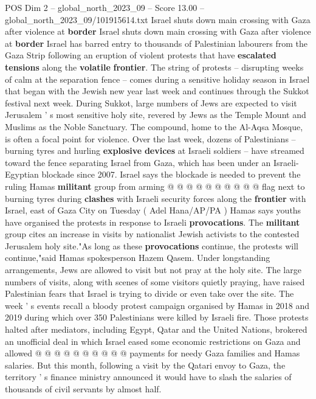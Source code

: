 \begin{textsample}{POS Dim 2 – global\_north\_2023\_09 – Score 13.00 – global\_north\_2023\_09/101915614.txt}  \label{ex:f2_pos_135}
Israel shuts down main crossing with Gaza after violence at \textbf{border} Israel shuts down main crossing with Gaza after violence at \textbf{border} Israel has barred entry to thousands of Palestinian labourers from the Gaza Strip following an eruption of violent protests that have \textbf{escalated} \textbf{tensions} along the \textbf{volatile} \textbf{frontier}.
The string of protests -- disrupting weeks of calm at the separation fence -- comes during a sensitive holiday season in Israel that began with the Jewish new year last week and continues through the Sukkot festival next week.
During Sukkot, large numbers of Jews are expected to visit Jerusalem ' s most sensitive holy site, revered by Jews as the Temple Mount and Muslims as the Noble Sanctuary.
The compound, home to the Al-Aqsa Mosque, is often a focal point for violence.
Over the last week, dozens of Palestinians -- burning tyres and hurling \textbf{explosive} \textbf{devices} at Israeli soldiers -- have streamed toward the fence separating Israel from Gaza, which has been under an Israeli-Egyptian blockade since 2007.
Israel says the blockade is needed to prevent the ruling Hamas \textbf{militant} group from arming @ @ @ @ @ @ @ @ @ @ flag next to burning tyres during \textbf{clashes} with Israeli security forces along the \textbf{frontier} with Israel, east of Gaza City on Tuesday ( Adel Hana/AP/PA ) Hamas says youths have organised the protests in response to Israeli \textbf{provocations}.
The \textbf{militant} group cites an increase in visits by nationalist Jewish activists to the contested Jerusalem holy site."As long as these \textbf{provocations} continue, the protests will continue,"said Hamas spokesperson Hazem Qasem.
Under longstanding arrangements, Jews are allowed to visit but not pray at the holy site.
The large numbers of visits, along with scenes of some visitors quietly praying, have raised Palestinian fears that Israel is trying to divide or even take over the site.
The week ' s events recall a bloody protest campaign organised by Hamas in 2018 and 2019 during which over 350 Palestinians were killed by Israeli fire.
Those protests halted after mediators, including Egypt, Qatar and the United Nations, brokered an unofficial deal in which Israel eased some economic restrictions on Gaza and allowed @ @ @ @ @ @ @ @ @ @ payments for needy Gaza families and Hamas salaries.
But this month, following a visit by the Qatari envoy to Gaza, the territory ' s finance ministry announced it would have to slash the salaries of thousands of civil servants by almost half.

\end{textsample}
